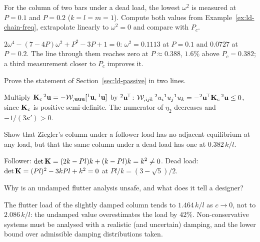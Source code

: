 \label{exo:ld-vibration}
%
For the column of two bars under a dead load, the lowest $\omega^2$ is measured at
$P = 0.1$ and $P = 0.2$ ($k = l = m = 1$). Compute both values from
Example~\ref{ex:ld-chain-freq}, extrapolate linearly to $\omega^2 = 0$ and compare with $P_c$.
\begin{solution}
$2\omega^4 - (7 - 4P)\omega^2 + P^2 - 3P + 1 = 0$: $\omega^2 = 0.1113$ at $P = 0.1$ and
$0.0727$ at $P = 0.2$. The line through them reaches zero at $P \approx 0.388$, $1.6\%$
above $P_c = 0.382$; a third measurement closer to $P_c$ improves it.
\end{solution}

\label{exo:ld-passive}
%
Prove the statement of Section~\ref{sec:ld-passive} in two lines.
\begin{solution}
Multiply $\mathbf{K}_c\,{}^2\mathbf{u} = -\mathcal{W}_{,\mathbf{u}\mathbf{u}\mathbf{u}}[{}^1\mathbf{u},{}^1\mathbf{u}]$ by
${}^2\mathbf{u}^{\!\top}$: $\mathcal{W}_{,ijk}\,{}^2u_i{}^1u_j{}^1u_k = -{}^2\mathbf{u}^{\!\top}\mathbf{K}_c\,{}^2\mathbf{u} \le 0$,
since $\mathbf{K}_c$ is positive semi-definite. The numerator of $\eta_2$ decreases and
$-1/(3\kappa') > 0$.
\end{solution}

\label{exo:ld-static}
%
Show that Ziegler's column under a follower load has no adjacent equilibrium at any
load, but that the same column under a dead load has one at $0.382\,k/l$.
\begin{solution}
Follower: $\det\mathbf{K} = (2k - Pl)k + (k - Pl)k = k^2 \neq 0$. Dead load:
$\det\mathbf{K} = (Pl)^2 - 3kPl + k^2 = 0$ at $Pl/k = (3 - \sqrt5)/2$.
\end{solution}

\label{exo:ld-paradox}
%
Why is an undamped flutter analysis unsafe, and what does it tell a designer?
\begin{solution}
The flutter load of the slightly damped column tends to $1.464\,k/l$ as $c \to 0$, not
to $2.086\,k/l$: the undamped value overestimates the load by $42\%$. Non-conservative
systems must be analysed with a realistic (and uncertain) damping, and the lower
bound over admissible damping distributions taken.
\end{solution}


